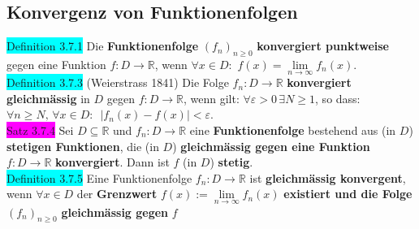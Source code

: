 \documentclass[landscape, 10pt]{article}
\newcommand{\R}{\mathbb{R}}
\begin{document}
\begin{multicols}{3}
       \subsection{Konvergenz von Funktionenfolgen}
              \colorbox{cyan}{Definition 3.7.1} 
                     Die \textbf{Funktionenfolge} 
                     \textcolor{NavyBlue}{$(f_n)_{n\geqslant0}$}
                     \textbf{konvergiert punktweise} gegen eine Funktion
                     \textcolor{NavyBlue}{$f:D\longrightarrow\R$}, wenn 
                     \textcolor{NavyBlue}{
                     $\forall x\in D:$\quad
                     $f(x)=\lim\limits_{n\to\infty}f_n(x)$}.\\
              \colorbox{cyan}{Definition 3.7.3} 
              (Weierstrass 1841) 
                     Die Folge \textcolor{NavyBlue}{$f_n:D\longrightarrow\R$} 
                     \textbf{konvergiert gleichmässig} in 
                     \textcolor{NavyBlue}{$D$} gegen 
                     \textcolor{NavyBlue}{$f:D\longrightarrow\R$}, 
                     wenn gilt: 
                     \textcolor{NavyBlue}{
                     $\forall\varepsilon>0\,\exists N\geqslant1$}, 
                     so dass: \textcolor{NavyBlue}{
                     $\forall n\geqslant N,\,\forall x\in D:\enspace 
                     |f_n(x)-f(x)|<\varepsilon$}.\\
              \colorbox{magenta}{Satz 3.7.4} 
                     Sei \textcolor{NavyBlue}{$D\subseteq\R$} und 
                     \textcolor{NavyBlue}{$f_n:D\longrightarrow\R$} 
                     eine \textbf{Funktionenfolge} bestehend aus 
                     (in $D$) \textbf{stetigen Funktionen}, die 
                     (in $D$) \textbf{gleichmässig gegen eine 
                     Funktion} \textcolor{NavyBlue}{$f:D\longrightarrow\R$} 
                     \textbf{konvergiert}. 
                     Dann ist \textcolor{NavyBlue}{$f$} (in $D$) \textbf{stetig}.\\
              \colorbox{cyan}{Definition 3.7.5} 
                     Eine Funktionenfolge 
                     \textcolor{NavyBlue}{$f_n:D\longrightarrow\R$}
                     ist \textbf{gleichmässig konvergent}, wenn 
                     \textcolor{NavyBlue}{$\forall x\in D$} der 
                     \textbf{Grenzwert} 
                     \textcolor{NavyBlue}{$f(x):=\lim\limits_{n\to\infty}f_n(x)$}
                     \textbf{existiert und die Folge}
                     \textcolor{NavyBlue}{$(f_n)_{n\geqslant0}$} 
                     \textbf{gleichmässig gegen} \textcolor{NavyBlue}{$f$} 

\end{multicols}
\end{document}
